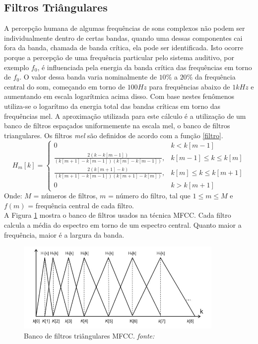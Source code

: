 \subsection{Filtros Triângulares}
\label{sec:filt_tri}
A percepção humana de algumas frequências de sons complexos não podem ser individualmente dentro de certas bandas, quando uma dessas componentes cai fora da banda, chamada de banda crítica, ela pode ser identificada. Isto ocorre porque a percepção de uma frequência particular pelo sistema auditivo, por exemplo $f_0$, é influenciada pela energia da banda crítica das frequências em torno de $f_0$. O valor dessa banda varia nominalmente de $10 \%$ a $20 \%$ da frequência central do som, começando em torno de $100 Hz$ para frequências abaixo de $1 kHz$ e aumentando em escala logarítmica acima disso. Com base nestes fenômenos utiliza-se o logarítmo da energia total das bandas críticas em torno das frequências mel. A aproximação utilizada para este cálculo é a utilização de um banco de filtros espaçados uniformemente na escala mel, o banco de filtros triangulares. Os filtros \textit{mel} são definidos de acordo com a função \ref{filtro}.
\begin{equation}
\label{filtro}
H_m[k] = \left\{\begin{array}{ll}
0 & k < k[m-1]\\
\displaystyle \frac{2(k-k[m-1])}{(k[m+1]-k[m-1])(k[m]-k[m-1])}, & k[m-1] \leq k \leq k[m] \\
\displaystyle \frac{2(k[m+1]-k)}{(k[m+1]-k[m-1])(k[m+1]-k[m])}, & k[m] \leq k \leq k[m+1] \\
0 & k > k[m+1]\end{array} \right.
\end{equation}
 Onde:
$M$ = números de filtros, $m$ = número do filtro, tal que $1 \leq m \leq M$ e $f(m)$ = frequência central de cada filtro.\\

A Figura \ref{fig:filtro} mostra o banco de filtros usados na técnica MFCC. Cada filtro calcula a média do espectro em torno de um espectro central. Quanto maior a frequência, maior é a largura da banda.

\begin{figure}[H]
\centering %
\includegraphics[width=10cm]{img/filtrotriangular.jpg} %
\caption{Banco de filtros triângulares MFCC. \textit{fonte: \cite{pucpncc}}}
\label{fig:filtro}
\end{figure}

